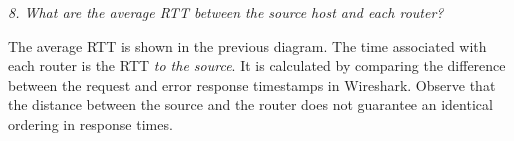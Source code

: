 

\textit{8. What are the average RTT between the source host and each router?}

The average RTT is shown in the previous diagram. The time associated with each router is the RTT \textit{to the source}. It is calculated by comparing the difference between the request and error response timestamps in Wireshark. Observe that the distance between the source and the router does not guarantee an identical ordering in response times.
